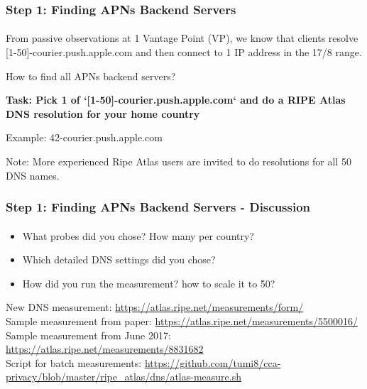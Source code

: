 
\begin{frame}
\frametitle{Step 1: Finding APNs Backend Servers}
\framesubtitle{}

From passive observations at 1 Vantage Point (VP), we know that clients resolve [1-50]-courier.push.apple.com and then connect to 1 IP address in the 17/8 range.

How to find all APNs backend servers?
\pause

\textbf{Task: Pick 1 of `[1-50]-courier.push.apple.com` and do a RIPE Atlas DNS resolution for your home country}

Example: 42-courier.push.apple.com

Note: More experienced Ripe Atlas users are invited to do resolutions for all 50 DNS names.

\end{frame}
\clearpage
\begin{frame}
\frametitle{Step 1: Finding APNs Backend Servers - Discussion}
\framesubtitle{}
\begin{itemize}
	\item What probes did you chose? How many per country?
	\item Which detailed DNS settings did you chose?
	\item How did you run the measurement? how to scale it to 50?
\end{itemize}
New DNS measurement: \url{https://atlas.ripe.net/measurements/form/} \\
Sample measurement from paper: \url{https://atlas.ripe.net/measurements/5500016/} \\
Sample measurement from June 2017: \url{https://atlas.ripe.net/measurements/8831682} \\
Script for batch measurements: \url{https://github.com/tumi8/cca-privacy/blob/master/ripe\_atlas/dns/atlas-measure.sh} \\

\end{frame}
\clearpage
